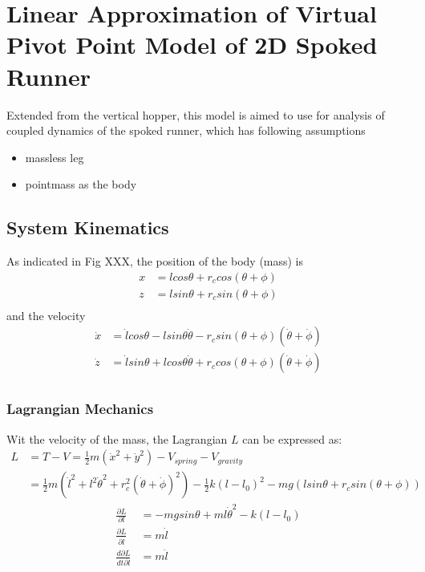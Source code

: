 \section{Linear Approximation of Virtual Pivot Point Model of 2D Spoked Runner}

Extended from the vertical hopper, this model is aimed to use for analysis of coupled dynamics of the spoked runner, which has following assumptions

\begin{itemize}
\item massless leg
\item pointmass as the body
\end{itemize}


\subsection{System Kinematics}
As indicated in Fig XXX, the position of the body (mass) is
\begin{align*}
x &= lcos\theta + r_ccos(\theta +\phi)\\
z &= lsin\theta + r_csin(\theta +\phi)\\
\end{align*}
and the velocity
\begin{align*}
\dot x &= \dot lcos\theta -lsin\theta\dot \theta -  r_csin(\theta +\phi)(\dot\theta +\dot\phi)\\
\dot z &= \dot lsin\theta + lcos\theta \dot{\theta}+ r_ccos(\theta +\phi)(\dot\theta +\dot\phi)\\
\end{align*}





\subsubsection{Lagrangian Mechanics}
Wit the velocity of the mass, the Lagrangian $L$ can be expressed as:
\begin{align*}
L &= T-V = \frac{1}{2}m(\dot x^2+\dot y^2) - V_{spring} - V_{gravity}\\
 &= \frac{1}{2}m(\dot l^2 + l^2\dot \theta^2 + r_c^2(\dot\theta+\dot\phi)^2) - \frac{1}{2}k(l-l_0)^2-mg(lsin\theta + r_csin(\theta +\phi))
\end{align*}
\begin{align*}
\frac{\partial L}{\partial l} &= -mgsin\theta+ml\dot\theta^2 - k(l-l_0)\\
\frac{\partial L}{\partial \dot l} &= m\dot l\\
\frac{d\partial L}{dt\partial \dot l} &= m\ddot l
\end{align*}


